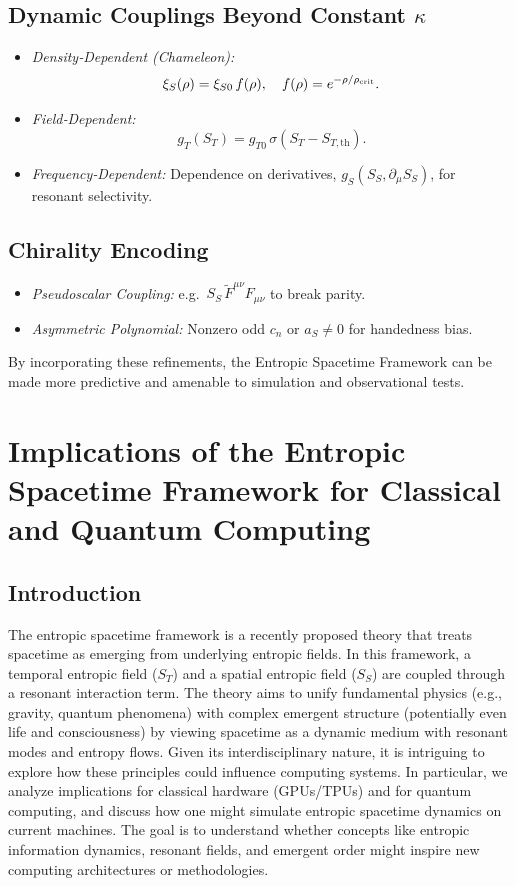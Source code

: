 \documentclass[11pt,a4paper]{article} %
\begin{document}
\subsection{Dynamic Couplings Beyond Constant $\kappa$}
\begin{itemize}
  \item \emph{Density‐Dependent (Chameleon):} 
    \[
    \xi_S(\rho) = \xi_{S0}\,f(\rho),\quad
    f(\rho)=e^{-\rho/\rho_{\rm crit}}.
    \]
  \item \emph{Field‐Dependent:} 
    \[
    g_T(S_T)=g_{T0}\,\sigma(S_T-S_{T,\mathrm{th}}).
    \]
  \item \emph{Frequency‐Dependent:} Dependence on derivatives, $g_S(S_S,\partial_\mu S_S)$, for resonant selectivity.
\end{itemize}

\subsection{Chirality Encoding}
\begin{itemize}
  \item \emph{Pseudoscalar Coupling:} e.g.\ $S_S\,\tilde F^{\mu\nu}F_{\mu\nu}$ to break parity.
  \item \emph{Asymmetric Polynomial:} Nonzero odd $c_n$ or $a_S\neq0$ for handedness bias.
\end{itemize}

By incorporating these refinements, the Entropic Spacetime Framework can be made more predictive and amenable to simulation and observational tests.

\section{Implications of the Entropic Spacetime Framework for Classical and Quantum Computing}

\subsection{Introduction}
The entropic spacetime framework is a recently proposed theory that treats spacetime as emerging from underlying entropic fields. In this framework, a temporal entropic field (\(S_T\)) and a spatial entropic field (\(S_S\)) are coupled through a resonant interaction term. The theory aims to unify fundamental physics (e.g., gravity, quantum phenomena) with complex emergent structure (potentially even life and consciousness) by viewing spacetime as a dynamic medium with resonant modes and entropy flows. Given its interdisciplinary nature, it is intriguing to explore how these principles could influence computing systems. In particular, we analyze implications for classical hardware (GPUs/TPUs) and for quantum computing, and discuss how one might simulate entropic spacetime dynamics on current machines. The goal is to understand whether concepts like entropic information dynamics, resonant fields, and emergent order might inspire new computing architectures or methodologies.
\end{document}
